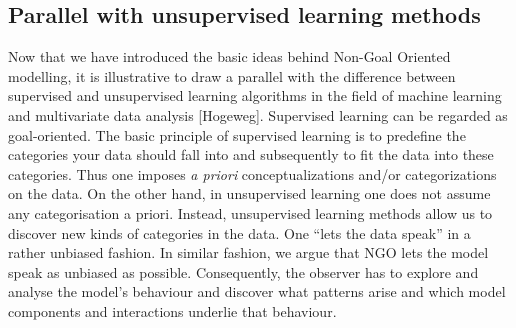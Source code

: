 \subsection{Parallel with unsupervised learning methods}

Now that we have introduced the basic ideas behind Non-Goal Oriented modelling, it is illustrative to draw a parallel with the difference between supervised and unsupervised learning algorithms in the field of machine learning and multivariate data analysis [Hogeweg]. Supervised learning can be regarded as goal-oriented. The basic principle of supervised learning is to predefine the categories your data should fall into and subsequently to fit the data into these categories. Thus one imposes \emph{a priori} conceptualizations and/or categorizations on the data. On the other hand, in unsupervised learning one does not assume any categorisation a priori. Instead, unsupervised learning methods allow us to discover new kinds of categories in the data. One “lets the data speak” in a rather unbiased fashion. In similar fashion, we argue that NGO lets the model speak as unbiased as possible. Consequently, the observer has to explore and analyse the model’s behaviour and discover what patterns arise and which model components and interactions underlie that behaviour.